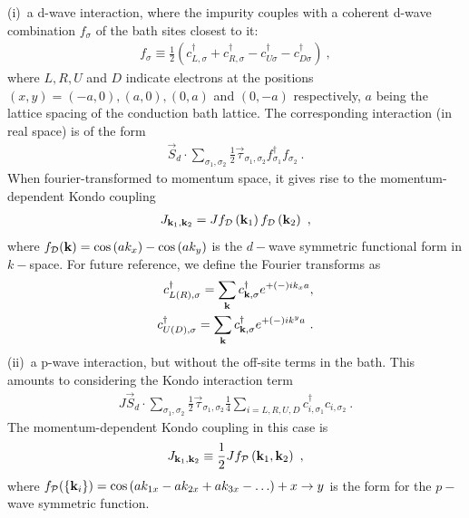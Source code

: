 \documentclass[reprint,hidelinks]{revtex4-2}
\begin{document}
(i)~a d-wave interaction, where the impurity couples with a coherent d-wave combination \(f_\sigma\) of the bath sites closest to it: 
\begin{equation}\begin{aligned}
	f_\sigma \equiv \frac{1}{2}\left(c^\dagger_{L,\sigma} + c^\dagger_{R,\sigma} - c^\dagger_{U\sigma} - c^\dagger_{D\sigma}\right)~,
\end{aligned}\end{equation}
where \(L,R,U\) and \(D\) indicate electrons at the positions \((x,y)=\left(-a,0\right), \left( a,0 \right) , \left( 0,a \right) \) and \(\left( 0,-a \right) \) respectively, \(a\) being the lattice spacing of the conduction bath lattice. The corresponding interaction (in real space) is of the form 
\begin{equation}\begin{aligned}
	\vec{S}_d\cdot\sum_{\sigma_1,\sigma_2}\frac{1}{2}\vec{\tau}_{\sigma_1,\sigma_2}f^\dagger_{\sigma_1}f_{\sigma_2}~.
\end{aligned}\end{equation}
When fourier-transformed to momentum space, it gives rise to the momentum-dependent Kondo coupling 
\begin{equation}\begin{aligned}\label{J_dwave}
	J_{{\bf k}_1, {\bf k}_2} = J f_\mathcal{D}\left({\bf k}_1\right) f_\mathcal{D}\left({\bf k}_2\right) ~,
\end{aligned}\end{equation}
where \(f_\mathcal{D}({\bf k}) = \cos\left( ak_x \right) - \cos\left( ak_y \right) \) is the \(d-\)wave symmetric functional form in \(k-\)space.
For future reference, we define the Fourier transforms as 
\begin{equation}\begin{aligned}
	c^\dagger_{L(R),\sigma} = \sum_{{\bf k}}c^\dagger_{{\bf k},\sigma}e^{+(-)ik_x a},\\
	c^\dagger_{U(D),\sigma} = \sum_{{\bf k}}c^\dagger_{{\bf k},\sigma}e^{+(-)ik^y a}~.
\end{aligned}\end{equation}
(ii)~a p-wave interaction, but without the off-site terms in the bath. This amounts to considering the Kondo interaction term 
\begin{equation}\begin{aligned}
	J\vec{S}_d\cdot\sum_{\sigma_1,\sigma_2}\frac{1}{2}\vec{\tau}_{\sigma_1,\sigma_2}\frac{1}{4}\sum_{i=L,R,U,D}c^\dagger_{i,\sigma_1}c_{i,\sigma_2}~.
\end{aligned}\end{equation}
The momentum-dependent Kondo coupling in this case is 
\begin{equation}\begin{aligned}\label{J_pwave_nooffsite}
	J_{{\bf k}_1, {\bf k}_2} \equiv \frac{1}{2}J f_\mathcal{P}\left( {\bf k}_1, {\bf k}_2\right) ~,
\end{aligned}\end{equation}
where \(f_\mathcal{P}(\left\{{\bf k}_i\right\}) = \cos\left( ak_{1x} - ak_{2x} + ak_{3x} - \ldots\right) + x\to y \) is the form for the \(p-\)wave symmetric function.
\end{document}

